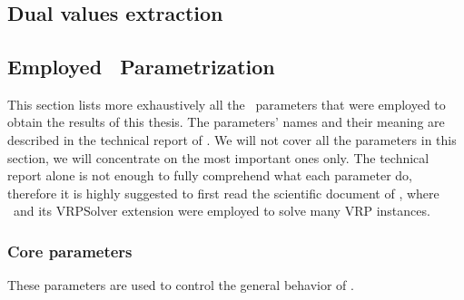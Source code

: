 \chapter{\bapcod}
\label{sec:bapcod-appendix}


%
%
%

\section{Dual values extraction}


\section{Employed \bapcod\ Parametrization}
\label{sec:employed-bapcod-parametrization}

This section lists more exhaustively all the \bapcod\ parameters
that were employed to obtain the results of this thesis.
The parameters' names and their meaning are described in the technical report of \textcite{sadykov2021}.
We will not cover all the parameters in this section,
we will concentrate on the most important ones only.
The technical report alone is not enough to fully comprehend what each parameter do,
therefore it is highly suggested to first read the scientific document of \textcite{pessoa2020a},
where \bapcod\ and its VRPSolver extension were employed to solve many VRP instances.

\subsection{Core parameters}

These parameters are used to control the general behavior of \bapcod.

